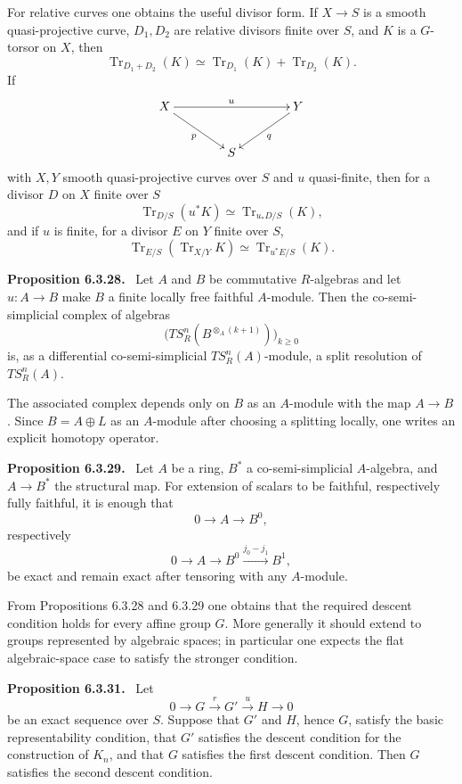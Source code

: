 \documentclass[12pt]{article}
\DeclareMathOperator{\Tr}{Tr}
\newenvironment{statement}[1]{\par\medskip\noindent\textbf{#1.}\ }{\par\medskip}
\begin{document}
For relative curves one obtains the useful divisor form. If \(X\to S\) is a smooth quasi-projective curve, \(D_1,D_2\) are relative divisors finite over \(S\), and \(K\) is a \(G\)-torsor on \(X\), then
\[
\Tr_{D_1+D_2}(K)\simeq\Tr_{D_1}(K)+\Tr_{D_2}(K).
\]
If
\[
\xymatrix@C=1.4cm{X\ar[rr]^u\ar[rd]_p&&Y\ar[ld]^q\\&S&}
\]
with \(X,Y\) smooth quasi-projective curves over \(S\) and \(u\) quasi-finite, then for a divisor \(D\) on \(X\) finite over \(S\)
\[
\Tr_{D/S}(u^*K)\simeq\Tr_{u_*D/S}(K),
\]
and if \(u\) is finite, for a divisor \(E\) on \(Y\) finite over \(S\),
\[
\Tr_{E/S}(\Tr_{X/Y}K)\simeq\Tr_{u^*E/S}(K).
\]

\begin{statement}{Proposition 6.3.28}
Let \(A\) and \(B\) be commutative \(R\)-algebras and let \(u:A\to B\) make \(B\) a finite locally free faithful \(A\)-module. Then the co-semi-simplicial complex of algebras
\[
\bigl(TS_R^n(B^{\otimes_A(k+1)})\bigr)_{k\ge0}
\]
is, as a differential co-semi-simplicial \(TS_R^n(A)\)-module, a split resolution of \(TS_R^n(A)\).
\end{statement}

The associated complex depends only on \(B\) as an \(A\)-module with the map \(A\to B\). Since \(B=A\oplus L\) as an \(A\)-module after choosing a splitting locally, one writes an explicit homotopy operator.

\begin{statement}{Proposition 6.3.29}
Let \(A\) be a ring, \(B^*\) a co-semi-simplicial \(A\)-algebra, and \(A\to B^*\) the structural map. For extension of scalars to be faithful, respectively fully faithful, it is enough that
\[
0\to A\to B^0,
\]
respectively
\[
0\to A\to B^0\xrightarrow{j_0-j_1}B^1,
\]
be exact and remain exact after tensoring with any \(A\)-module.
\end{statement}

From Propositions 6.3.28 and 6.3.29 one obtains that the required descent condition holds for every affine group \(G\). More generally it should extend to groups represented by algebraic spaces; in particular one expects the flat algebraic-space case to satisfy the stronger condition.

\begin{statement}{Proposition 6.3.31}
Let
\[
0\to G\xrightarrow r G'\xrightarrow u H\to0
\]
be an exact sequence over \(S\). Suppose that \(G'\) and \(H\), hence \(G\), satisfy the basic representability condition, that \(G'\) satisfies the descent condition for the construction of \(K_n\), and that \(G\) satisfies the first descent condition. Then \(G\) satisfies the second descent condition.
\end{statement}
\end{document}
